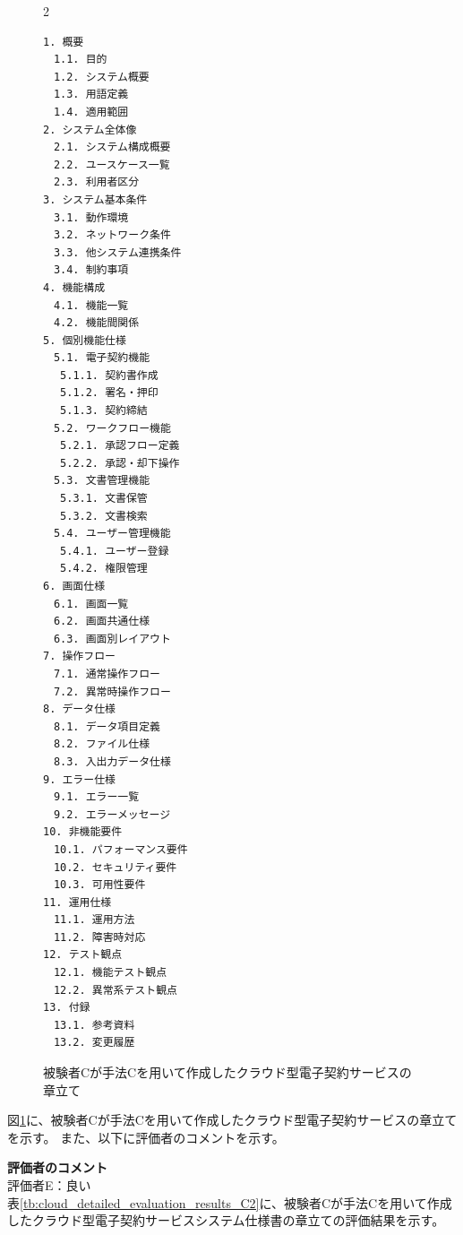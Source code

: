 \begin{figure}[tp]
\begin{tcolorbox}[
  colback=white,
  colframe=orange,
  fonttitle=\bfseries
]
\begin{multicols}{2}
\footnotesize
\ttfamily
\fontsize{8}{9}\selectfont
\begin{verbatim}
1. 概要
　1.1. 目的
　1.2. システム概要
　1.3. 用語定義
　1.4. 適用範囲
2. システム全体像
　2.1. システム構成概要
　2.2. ユースケース一覧
　2.3. 利用者区分
3. システム基本条件
　3.1. 動作環境
　3.2. ネットワーク条件
　3.3. 他システム連携条件
　3.4. 制約事項
4. 機能構成
　4.1. 機能一覧
　4.2. 機能間関係
5. 個別機能仕様
　5.1. 電子契約機能
 　5.1.1. 契約書作成
 　5.1.2. 署名・押印
 　5.1.3. 契約締結
　5.2. ワークフロー機能
 　5.2.1. 承認フロー定義
 　5.2.2. 承認・却下操作
　5.3. 文書管理機能
 　5.3.1. 文書保管
 　5.3.2. 文書検索
　5.4. ユーザー管理機能
 　5.4.1. ユーザー登録
 　5.4.2. 権限管理
6. 画面仕様
　6.1. 画面一覧
　6.2. 画面共通仕様
　6.3. 画面別レイアウト
7. 操作フロー
　7.1. 通常操作フロー
　7.2. 異常時操作フロー
8. データ仕様
　8.1. データ項目定義
　8.2. ファイル仕様
　8.3. 入出力データ仕様
9. エラー仕様
　9.1. エラー一覧
　9.2. エラーメッセージ
10. 非機能要件
　10.1. パフォーマンス要件
　10.2. セキュリティ要件
　10.3. 可用性要件
11. 運用仕様
　11.1. 運用方法
　11.2. 障害時対応
12. テスト観点
　12.1. 機能テスト観点
　12.2. 異常系テスト観点
13. 付録
　13.1. 参考資料
　13.2. 変更履歴
\end{verbatim}
\end{multicols}
\end{tcolorbox}
\caption{被験者Cが手法Cを用いて作成したクラウド型電子契約サービスの章立て}
\label{fig:C_chapter_structure_of_cloud_contract_system_2}
\end{figure}


図\ref{fig:C_chapter_structure_of_cloud_contract_system_2}に、被験者Cが手法Cを用いて作成したクラウド型電子契約サービスの章立てを示す。
また、以下に評価者のコメントを示す。

\noindent\textbf{評価者のコメント}\\
評価者E：良い\\

表\ref{tb:cloud_detailed_evaluation_results_C2}に、被験者Cが手法Cを用いて作成したクラウド型電子契約サービスシステム仕様書の章立ての評価結果を示す。

